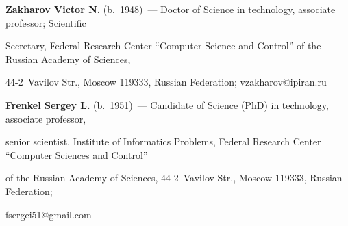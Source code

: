 \textbf{Zakharov Victor N.} (b.\ 1948)~--- Doctor of Science in technology, associate professor; Scientific 


Secretary, Federal Research Center ``Computer Science and Control'' of the Russian Academy of Sciences, 


44-2~Vavilov Str., Moscow 119333, Russian Federation; \mbox{vzakharov@ipiran.ru}













\noindent


\textbf{Frenkel Sergey L.} (b.\ 1951)~--- Candidate of Science (PhD) in technology, associate professor, 


senior scientist, Institute of Informatics Problems, Federal Research Center ``Computer Sciences and Control'' 


of the Russian Academy of Sciences, 44-2~Vavilov Str., Moscow 119333, Russian Federation; 


fsergei51@gmail.com 





    


\label{end\stat}





\renewcommand{\bibname}{\protect\rm Литература}  


